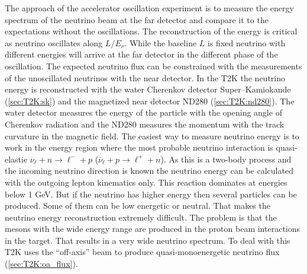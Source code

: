 \documentclass[../main.tex]{subfiles}
\begin{document}
The approach of the accelerator oscillation experiment is to measure the energy spectrum of the neutrino beam at the far detector and compare it to the expectations without the oscillations. The reconstruction of the energy is critical as neutrino oscillates along $L/E_\nu$. While the baseline $L$ is fixed neutrino with different energies will arrive at the far detector in the different phase of the oscillation. The expected neutrino flux can be constrained with the measurements of the unoscillated neutrinos with the near detector. In the T2K the neutrino energy is reconstructed with the water Cherenkov detector Super--Kamiokande (\autoref{sec:T2K:sk}) and the magnetized near detector ND280 (\autoref{sec:T2K:nd280}). The water detector measures the energy of the particle with the opening angle of Cherenkov radiation and the ND280 measures the momentum with the track curvature in the magnetic field. The easiest way to measure neutrino energy is to work in the energy region where the most probable neutrino interaction is quasi-elastic $\nu_\ell+n\to\ell^-+p$ ($\overline{\nu}_\ell+p\to\ell^++n$). As this is a two-body process and the incoming neutrino direction is known the neutrino energy can be calculated with the outgoing lepton kinematics only. This reaction dominates at energies below 1 GeV. But if the neutrino has higher energy then several particles can be produced. Some of them can be low energetic or neutral. That makes the neutrino energy reconstruction extremely difficult. The problem is that the mesons with the wide energy range are produced in the proton beam interactions in the target. That results in a very wide neutrino spectrum. To deal with this T2K uses the ``off-axis'' beam to produce quasi-monoenergetic neutrino flux (\autoref{sec:T2K:oa_flux}).
\end{document}
